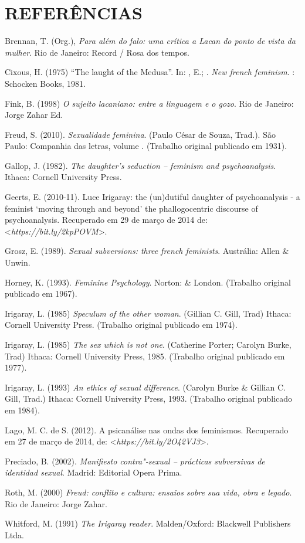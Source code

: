 \section{REFERÊNCIAS}

Brennan, T. (Org.), \emph{Para além do falo: uma crítica a Lacan do
ponto de vista da mulher}. Rio de Janeiro: Record / Rosa dos tempos.

Cixous, H. (1975) ``The laught of the Medusa''. In: , E.; . \emph{New french feminism}. : Schocken Books, 1981.

Fink, B. (1998) \emph{O sujeito lacaniano: entre a linguagem e o gozo}.
Rio de Janeiro: Jorge Zahar Ed.

Freud, S. (2010). \emph{Sexualidade feminina}. (Paulo César de Souza,
Trad.). São Paulo: Companhia das letras, volume . (Trabalho
original publicado em 1931).

Gallop, J. (1982). \emph{The daughter's seduction -- feminism and
psychoanalysis}. Ithaca: Cornell University Press.

Geerts, E. (2010-11). Luce Irigaray: the (un)dutiful daughter of
psychoanalysis - a feminist `moving through and beyond' the
phallogocentric discourse of psychoanalysis. Recuperado em 29 de março
de 2014 de:
\textless{}\emph{https://bit.ly/2kpPOVM}\textgreater{}.

Grosz, E. (1989). \emph{Sexual subversions: three french feminists}.
Austrália: Allen \& Unwin.

Horney, K. (1993). \emph{Feminine Psychology}. Norton:  \& London.
(Trabalho original publicado em 1967).

Irigaray, L. (1985) \emph{Speculum of the other woman}. (Gillian C.
Gill, Trad) Ithaca: Cornell University Press. (Trabalho original
publicado em 1974).

Irigaray, L. (1985) \emph{The sex which is not one}. (Catherine Porter;
Carolyn Burke, Trad) Ithaca: Cornell University Press, 1985. (Trabalho
original publicado em 1977).

Irigaray, L. (1993) \emph{An ethics of sexual difference}. (Carolyn
Burke \& Gillian C. Gill, Trad.) Ithaca: Cornell University Press, 1993.
(Trabalho original publicado em 1984).

Lago, M. C. de S. (2012). A psicanálise nas ondas dos feminismos.
Recuperado em 27 de março de 2014, de:
\textless{}\emph{https://bit.ly/2O42VJ3}\textgreater{}.

Preciado, B. (2002). \emph{Manifiesto contra"-sexual -- prácticas
subversivas de identidad sexual}. Madrid: Editorial Opera Prima.

Roth, M. (2000) \emph{Freud: conflito e cultura: ensaios sobre sua vida,
obra e legado}. Rio de Janeiro: Jorge Zahar.

Whitford, M. (1991) \emph{The Irigaray reader}. Malden/Oxford: Blackwell
Publishers Ltda.
